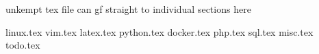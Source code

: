 unkempt tex file can gf straight to individual sections here

linux.tex
vim.tex
latex.tex
python.tex
docker.tex
php.tex
sql.tex
misc.tex
todo.tex
